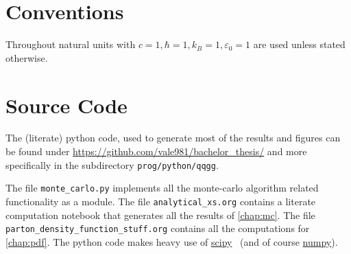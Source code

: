 \section{Conventions}%
\label{sec:convent}

Throughout natural units with \(c=1, \hbar = 1, k_B=1, \varepsilon_0
= 1\) are used unless stated otherwise.

\section{Source Code}%
\label{sec:source}

The (literate) python code, used to generate most of the results and
figures can be found under
\url{https://github.com/vale981/bachelor_thesis/} and more
specifically in the subdirectory \texttt{prog/python/qqgg}.

The file \texttt{monte\_carlo.py} implements all the monte-carlo
algorithm related functionality as a module. The file
\texttt{analytical\_xs.org} contains a literate computation notebook
that generates all the results of \cref{chap:mc}. The file
\texttt{parton\_density\_function\_stuff.org} contains all the
computations for \cref{chap:pdf}. The python code makes heavy use of
\href{https://www.scipy.org/}{scipy}~\cite{2020Virtanen:Sc} (and of
course \href{https://numpy.org/}{numpy}).

